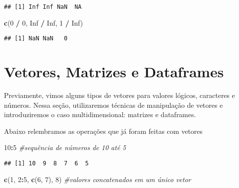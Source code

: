 \documentclass[]{book}
\newenvironment{Shaded}{\begin{snugshade}}{\end{snugshade}}
\newcommand{\CommentTok}[1]{\textcolor[rgb]{0.56,0.35,0.01}{\textit{#1}}}
\newcommand{\DecValTok}[1]{\textcolor[rgb]{0.00,0.00,0.81}{#1}}
\newcommand{\KeywordTok}[1]{\textcolor[rgb]{0.13,0.29,0.53}{\textbf{#1}}}
\newcommand{\NormalTok}[1]{#1}
\newcommand{\OperatorTok}[1]{\textcolor[rgb]{0.81,0.36,0.00}{\textbf{#1}}}
\newcommand{\OtherTok}[1]{\textcolor[rgb]{0.56,0.35,0.01}{#1}}
\newcommand{\StringTok}[1]{\textcolor[rgb]{0.31,0.60,0.02}{#1}}
\theoremstyle{definition}
\theoremstyle{definition}
\theoremstyle{definition}
\theoremstyle{remark}
\begin{document}
\begin{verbatim}
## [1] Inf Inf NaN  NA
\end{verbatim}

\begin{Shaded}
\begin{Highlighting}[]
\KeywordTok{c}\NormalTok{(}\DecValTok{0} \OperatorTok{/}\StringTok{ }\DecValTok{0}\NormalTok{, }\OtherTok{Inf} \OperatorTok{/}\StringTok{ }\OtherTok{Inf}\NormalTok{, }\DecValTok{1} \OperatorTok{/}\StringTok{ }\OtherTok{Inf}\NormalTok{)}
\end{Highlighting}
\end{Shaded}

\begin{verbatim}
## [1] NaN NaN   0
\end{verbatim}

\hypertarget{vetores-matrizes-e-dataframes}{%
\section{Vetores, Matrizes e Dataframes}\label{vetores-matrizes-e-dataframes}}

Previamente, vimos alguns tipos de vetores para valores lógicos, caracteres e números.
Nessa seção, utilizaremos técnicas de manipulação de vetores e introduziremos o caso multidimensional: matrizes e dataframes.

Abaixo relembramos as operações que já foram feitas com vetores

\begin{Shaded}
\begin{Highlighting}[]
\DecValTok{10}\OperatorTok{:}\DecValTok{5}                    \CommentTok{#sequência de números de 10 até 5}
\end{Highlighting}
\end{Shaded}

\begin{verbatim}
## [1] 10  9  8  7  6  5
\end{verbatim}

\begin{Shaded}
\begin{Highlighting}[]
\KeywordTok{c}\NormalTok{(}\DecValTok{1}\NormalTok{, }\DecValTok{2}\OperatorTok{:}\DecValTok{5}\NormalTok{, }\KeywordTok{c}\NormalTok{(}\DecValTok{6}\NormalTok{, }\DecValTok{7}\NormalTok{), }\DecValTok{8}\NormalTok{)   }\CommentTok{#valores concatenados em um único vetor}
\end{Highlighting}
\end{Shaded}
\end{document}
